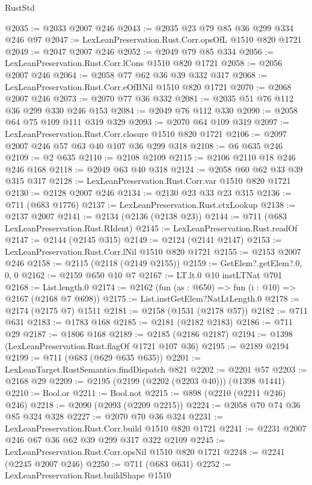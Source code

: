 \begin{lexlean}{RustStd}
\begin{coremodule}
@2035 := @2033 @2007 @246
@2043 := @2035 @23 @79 @85 @36 @299 @334 @246 @97
@2047 := LexLeanPreservation.Rust.Corr.opsOfL @1510 @820 @1721
@2049 := @2047 @2007 @246
@2052 := @2049 @79 @85 @334
@2056 := LexLeanPreservation.Rust.Corr.lCons @1510 @820 @1721
@2058 := @2056 @2007 @246
@2064 := @2058 @77 @62 @36 @39 @332 @317
@2068 := LexLeanPreservation.Rust.Corr.eOfBNil @1510 @820 @1721
@2070 := @2068 @2007 @246
@2073 := @2070 @77 @36 @332
@2081 := @2035 @51 @76 @112 @36 @299 @330 @246 @153
@2084 := @2049 @76 @112 @330
@2090 := @2058 @64 @75 @109 @111 @319 @329
@2093 := @2070 @64 @109 @319
@2097 := LexLeanPreservation.Rust.Corr.closure @1510 @820 @1721
@2106 := @2097 @2007 @246 @57 @63 @40 @107 @36 @299 @318
@2108 := @6 @635 @246
@2109 := @2 @635
@2110 := @2108 @2109
@2115 := @2106 @2110 @18 @246 @246 @168
@2118 := @2049 @63 @40 @318
@2124 := @2058 @60 @62 @33 @39 @315 @317
@2128 := LexLeanPreservation.Rust.Corr.var @1510 @820 @1721
@2130 := @2128 @2007 @246
@2134 := @2130 @23 @33 @23 @315
@2136 := @711 (@683 @1776)
@2137 := LexLeanPreservation.Rust.ctxLookup
@2138 := @2137 @2007
@2141 := @2134 (@2136 (@2138 @23))
@2144 := @711 (@683 LexLeanPreservation.Rust.RIdent)
@2145 := LexLeanPreservation.Rust.readOf
@2147 := @2144 (@2145 @315)
@2149 := @2124 (@2141 @2147)
@2153 := LexLeanPreservation.Rust.Corr.lNil @1510 @820 @1721
@2155 := @2153 @2007 @246
@2158 := @2115 (@2118 (@2149 @2155))
@2159 := GetElem?.getElem?.{0, 0, 0}
@2162 := @2159 @650 @10 @7
@2167 := LT.lt.{0} @10 instLTNat @701
@2168 := List.length.{0}
@2174 := @2162 (fun (as : @650) => fun (i : @10) => @2167 (@2168 @7 @698))
@2175 := List.instGetElem?NatLtLength.{0}
@2178 := @2174 (@2175 @7) @1511
@2181 := @2158 (@1531 (@2178 @57))
@2182 := @711 @631
@2183 := @1783 @168
@2185 := @2181 (@2182 @2183)
@2186 := @711 @29
@2187 := @1806 @168
@2189 := @2185 (@2186 @2187)
@2194 := @1398 (LexLeanPreservation.Rust.flagOf @1721 @107 @36)
@2195 := @2189 @2194
@2199 := @711 (@683 (@629 @635 @635))
@2201 := LexLeanTarget.RustSemantics.findDispatch @821
@2202 := @2201 @57
@2203 := @2168 @29
@2209 := @2195 (@2199 (@2202 (@2203 @40))) (@1398 @1441)
@2210 := Bool.or
@2211 := Bool.not
@2215 := @898 (@2210 (@2211 @246) @246)
@2218 := @2090 (@2093 (@2209 @2215))
@2224 := @2058 @70 @74 @36 @85 @324 @328
@2227 := @2070 @70 @36 @324
@2231 := LexLeanPreservation.Rust.Corr.build @1510 @820 @1721
@2241 := @2231 @2007 @246 @67 @36 @62 @39 @299 @317 @322 @2109
@2245 := LexLeanPreservation.Rust.Corr.opsNil @1510 @820 @1721
@2248 := @2241 (@2245 @2007 @246)
@2250 := @711 (@683 @631)
@2252 := LexLeanPreservation.Rust.buildShape @1510

\end{coremodule}
\end{lexlean}
